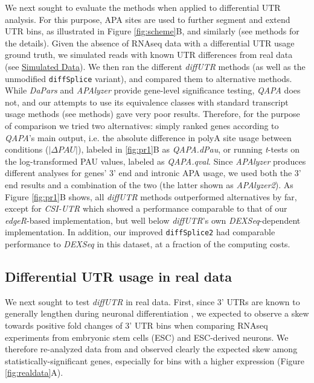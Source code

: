 \documentclass{bmcart}
\begin{document}
We next sought to evaluate the methods when applied to differential UTR analysis. For this purpose, APA sites are used to further segment and extend UTR bins, as illustrated in Figure \ref{fig:scheme}B, and similarly \cite{HarrisonDetection2019} (see methods for the details). Given the absence of RNAseq data with a differential UTR usage ground truth, we simulated reads with known UTR differences from real data (see \hyperref[sec:sim]{Simulated Data}). We then ran the different \textit{diffUTR} methods (as well as the unmodified \texttt{diffSplice} variant), and compared them to alternative methods. While \textit{DaPars} and \textit{APAlyzer} provide gene-level significance testing, \textit{QAPA} does not, and our attempts to use its equivalence classes with standard transcript usage methods (see methods) gave very poor results. Therefore, for the purpose of comparison we tried two alternatives: simply ranked genes according to \textit{QAPA}'s main output, i.e. the absolute difference in polyA site usage between conditions ($|\Delta PAU|$), labeled in \ref{fig:pr1}B as \textit{QAPA.dPau}, or running \textit{t}-tests on the log-transformed PAU values, labeled as \textit{QAPA.qval}. Since \textit{APAlyzer} produces different analyses for genes' 3' end and intronic APA usage, we used both the 3' end results and a combination of the two (the latter shown as \textit{APAlyzer2}). As Figure \ref{fig:pr1}B shows, all \textit{diffUTR} methods outperformed alternatives by far, except for \textit{CSI-UTR} which showed a performance comparable to that of our \textit{edgeR}-based implementation, but well below \textit{diffUTR}'s own \textit{DEXSeq}-dependent implementation. In addition, our improved \texttt{diffSplice2} had comparable performance to \textit{DEXSeq} in this dataset, at a fraction of the computing costs.

\subsection*{Differential UTR usage in real data}

We next sought to test \textit{diffUTR} in real data. First, since 3' UTRs are known to generally lengthen during neuronal differentiation \cite{Blair2017WidespreadDifferentiation,Ha2018QAPA:Data}, we expected to observe a skew towards positive fold changes of 3' UTR bins when comparing RNAseq experiments from embryonic stem cells (ESC) and ESC-derived neurons. We therefore re-analyzed data from \cite{WhippleImprinted2020} and observed clearly the expected skew among statistically-significant genes, especially for bins with a higher expression (Figure \ref{fig:realdata}A).
\end{document}
